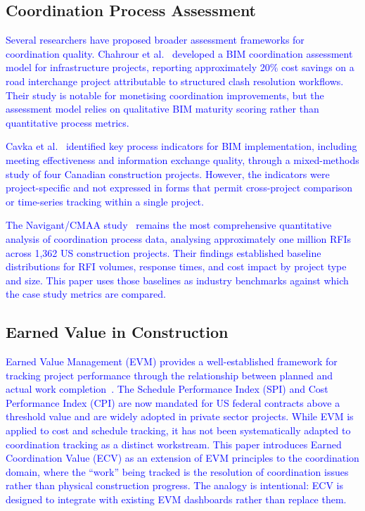\documentclass[conference]{IEEEtran}
\newcommand{\placeholder}[1]{\textcolor{blue}{#1}}
\begin{document}
\subsection{Coordination Process Assessment}
\placeholder{
Several researchers have proposed broader assessment frameworks for coordination quality. Chahrour et al.~\cite{chahrour2020} developed a BIM coordination assessment model for infrastructure projects, reporting approximately 20\% cost savings on a road interchange project attributable to structured clash resolution workflows. Their study is notable for monetising coordination improvements, but the assessment model relies on qualitative BIM maturity scoring rather than quantitative process metrics.

Cavka et al.~\cite{cavka2015} identified key process indicators for BIM implementation, including meeting effectiveness and information exchange quality, through a mixed-methods study of four Canadian construction projects. However, the indicators were project-specific and not expressed in forms that permit cross-project comparison or time-series tracking within a single project.

The Navigant/CMAA study~\cite{navigant2013} remains the most comprehensive quantitative analysis of coordination process data, analysing approximately one million RFIs across 1,362 US construction projects. Their findings established baseline distributions for RFI volumes, response times, and cost impact by project type and size. This paper uses those baselines as industry benchmarks against which the case study metrics are compared.
}

\subsection{Earned Value in Construction}
\placeholder{
Earned Value Management (EVM) provides a well-established framework for tracking project performance through the relationship between planned and actual work completion~\cite{fleming2010}. The Schedule Performance Index (SPI) and Cost Performance Index (CPI) are now mandated for US federal contracts above a threshold value and are widely adopted in private sector projects. While EVM is applied to cost and schedule tracking, it has not been systematically adapted to coordination tracking as a distinct workstream. This paper introduces Earned Coordination Value (ECV) as an extension of EVM principles to the coordination domain, where the ``work'' being tracked is the resolution of coordination issues rather than physical construction progress. The analogy is intentional: ECV is designed to integrate with existing EVM dashboards rather than replace them.
}
\end{document}
